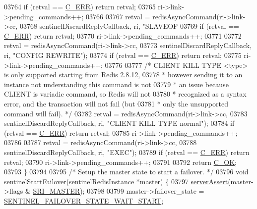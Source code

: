 \begin{DoxyCode}
{{{{{{{{{{{{{{{{{{{{{{{{{{{{{{{{{{{{{{{{{{{{{{{{{{{{{{{{{{{{{{{{{{{{{{{{{{{{{{{{{{{03764     \textcolor{keywordflow}{if} (retval == \hyperlink{server_8h_af98ac28d5f4d23d7ed5985188e6fb7d1}{C\_ERR}) \textcolor{keywordflow}{return} retval;
03765     ri->link->pending\_commands++;
03766 
03767     retval = redisAsyncCommand(ri->link->cc,
03768         sentinelDiscardReplyCallback, ri, \textcolor{stringliteral}{"SLAVEOF %
03769     \textcolor{keywordflow}{if} (retval == \hyperlink{server_8h_af98ac28d5f4d23d7ed5985188e6fb7d1}{C\_ERR}) \textcolor{keywordflow}{return} retval;
03770     ri->link->pending\_commands++;
03771 
03772     retval = redisAsyncCommand(ri->link->cc,
03773         sentinelDiscardReplyCallback, ri, \textcolor{stringliteral}{"CONFIG REWRITE"});
03774     \textcolor{keywordflow}{if} (retval == \hyperlink{server_8h_af98ac28d5f4d23d7ed5985188e6fb7d1}{C\_ERR}) \textcolor{keywordflow}{return} retval;
03775     ri->link->pending\_commands++;
03776 
03777     \textcolor{comment}{/* CLIENT KILL TYPE <type> is only supported starting from Redis 2.8.12,}
03778 \textcolor{comment}{     * however sending it to an instance not understanding this command is not}
03779 \textcolor{comment}{     * an issue because CLIENT is variadic command, so Redis will not}
03780 \textcolor{comment}{     * recognized as a syntax error, and the transaction will not fail (but}
03781 \textcolor{comment}{     * only the unsupported command will fail). */}
03782     retval = redisAsyncCommand(ri->link->cc,
03783         sentinelDiscardReplyCallback, ri, \textcolor{stringliteral}{"CLIENT KILL TYPE normal"});
03784     \textcolor{keywordflow}{if} (retval == \hyperlink{server_8h_af98ac28d5f4d23d7ed5985188e6fb7d1}{C\_ERR}) \textcolor{keywordflow}{return} retval;
03785     ri->link->pending\_commands++;
03786 
03787     retval = redisAsyncCommand(ri->link->cc,
03788         sentinelDiscardReplyCallback, ri, \textcolor{stringliteral}{"EXEC"});
03789     \textcolor{keywordflow}{if} (retval == \hyperlink{server_8h_af98ac28d5f4d23d7ed5985188e6fb7d1}{C\_ERR}) \textcolor{keywordflow}{return} retval;
03790     ri->link->pending\_commands++;
03791 
03792     \textcolor{keywordflow}{return} \hyperlink{server_8h_a303769ef1065076e68731584e758d3e1}{C\_OK};
03793 \}
03794 
03795 \textcolor{comment}{/* Setup the master state to start a failover. */}
03796 \textcolor{keywordtype}{void} sentinelStartFailover(sentinelRedisInstance *master) \{
03797     \hyperlink{server_8h_a88114b5169b4c382df6b56506285e56a}{serverAssert}(master->flags & \hyperlink{sentinel_8c_a2ee83e5ff67b45746cd6a310f15334b2}{SRI\_MASTER});
03798 
03799     master->failover\_state = \hyperlink{sentinel_8c_a83bf9fce7cbb7bf1b0723ced2d434366}{SENTINEL\_FAILOVER\_STATE\_WAIT\_START};
}}}}}}}}}}}}}}}}}}}}}}}}}}}}}}}}}}}}}}}}}}}}}}}}}}}}}}}}}}}}}}}}}}}}}}}}}}}}}}}}}}}}
\end{DoxyCode}
